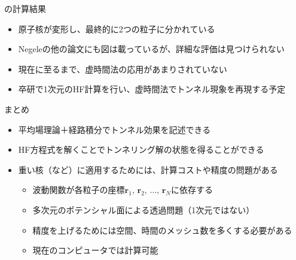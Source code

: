 \documentclass[14pt,aspectratio=169,xcolor=dvipsnames,table,dvipdfmx]{beamer}
\theoremstyle{definition}
\begin{document}
\begin{frame}{の計算結果}
  \begin{itemize}
    \item 原子核が変形し、最終的に2つの粒子に分かれている
    \item Negeleの他の論文にも図は載っているが、詳細な評価は見つけられない
    \item 現在に至るまで、虚時間法の応用があまりされていない
    \item 卒研で1次元のHF計算を行い、虚時間法でトンネル現象を再現する予定
  \end{itemize}
\end{frame}
\begin{frame}{まとめ}
  \begin{itemize}
    \item 平均場理論＋経路積分でトンネル効果を記述できる
    \item HF方程式を解くことでトンネリング解の状態を得ることができる
  \end{itemize}
  \begin{itemize}
    \item 重い核（など）に適用するためには、計算コストや精度の問題がある

          \begin{itemize}
            \item 波動関数が各粒子の座標$\bm{r}_1,\,\bm{r}_2,\,\dots,\,\bm{r}_N$に依存する
            \item 多次元のポテンシャル面による透過問題（1次元ではない）
            \item 精度を上げるためには空間、時間のメッシュ数を多くする必要がある
            \item 現在のコンピュータでは計算可能
          \end{itemize}
  \end{itemize}

\end{frame}
\end{document}
